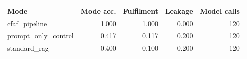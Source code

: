 \begin{tabular}{lrrrr}
Mode & Mode acc. & Fulfilment & Leakage & Model calls \\
\hline
cfaf_pipeline & 1.000 & 1.000 & 0.000 & 120 \\
prompt_only_control & 0.417 & 0.117 & 0.200 & 120 \\
standard_rag & 0.400 & 0.100 & 0.200 & 120 \\
\end{tabular}
